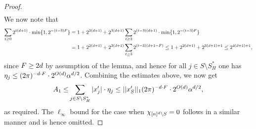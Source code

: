 \begin{proof}
\begin{equation*}
\begin{split}
\end{split}
\end{equation*}
We now note that
\begin{equation*}
\begin{split}
\sum_{t\geq 0} 2^{t(d+1)}\cdot \min\{1, 2^{-(t-3)F}\}&=1+2^{2(d+1)}+2^{3(d+1)}\sum_{t\geq 3} 2^{(t-3)(d+1)}\cdot \min\{1, 2^{-(t-3)F}\}\\
&=1+2^{2(d+1)}+2^{3(d+1)}\sum_{t\geq 3} 2^{(t-3)(d+1-F)}\leq 1+2^{2(d+1)}+2^{3(d+1)+1}\leq 2^{4(d+1)+1},\\
\end{split}
\end{equation*}
since $F\geq 2d$ by assumption of the lemma, and hence for all $j\in S\setminus S^*_H$ one has $\eta_j\leq  (2\pi)^{-d\cdot F}\cdot 2^{O(d)} \alpha^{d/2}$. Combining the estimates above, we now get
\begin{equation*}
\begin{split}
A_1\leq &\sum_{j\in S\setminus S^*_H} |x'_j|\cdot \eta_j\leq  ||x'_S||_1(2\pi)^{-d\cdot F}\cdot 2^{O(d)}\alpha^{d/2}, \\
\end{split}
\end{equation*}
 as required.  The $\ell_\infty$ bound for the case when $\chi_{{[n]^d}\setminus S}=0$ follows in a similar manner and is hence omitted.




\end{proof}

